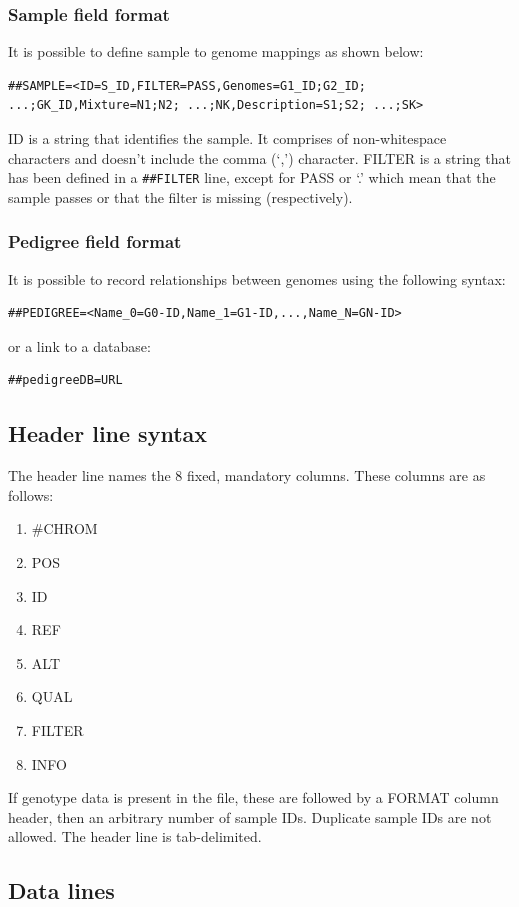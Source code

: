 \documentclass[8pt]{article}
\begin{document}
\subsubsection{Sample field format}
It is possible to define sample to genome mappings as shown below:
\small
\begin{verbatim}
##SAMPLE=<ID=S_ID,FILTER=PASS,Genomes=G1_ID;G2_ID; ...;GK_ID,Mixture=N1;N2; ...;NK,Description=S1;S2; ...;SK>
\end{verbatim}
\normalsize
ID is a string that identifies the sample. It comprises of non-whitespace characters and doesn't include the comma (`,') character.
FILTER is a string that has been defined in a \verb!##FILTER! line, except for PASS or `.' which mean that the sample passes or that the filter is missing (respectively).

\subsubsection{Pedigree field format}
It is possible to record relationships between genomes using the following syntax:
\begin{verbatim}
##PEDIGREE=<Name_0=G0-ID,Name_1=G1-ID,...,Name_N=GN-ID>
\end{verbatim}
or a link to a database:
\begin{verbatim}
##pedigreeDB=URL
\end{verbatim}
\subsection{Header line syntax}
The header line names the 8 fixed, mandatory columns. These columns are as follows:

\begin{enumerate}
  \item \#CHROM
  \item POS
  \item ID
  \item REF
  \item ALT
  \item QUAL
  \item FILTER
  \item INFO
\end{enumerate}

If genotype data is present in the file, these are followed by a FORMAT column header, then an arbitrary number of sample IDs. Duplicate sample IDs are not allowed. The header line is tab-delimited.

\subsection{Data lines}
\end{document}
